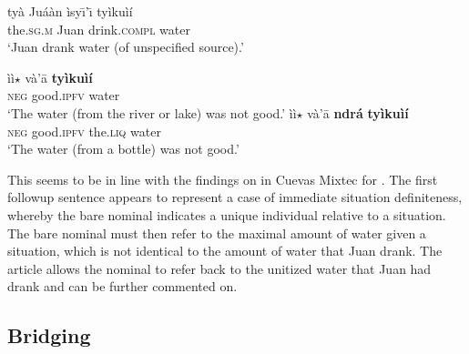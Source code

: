 \documentclass[output=paper,modfonts,nonflat]{langsci/langscibook}
\begin{document}
\ea {}\label{ex:cisneros:69}
\gll
{\ob}ty\`a Ju\'a\`an{\cb} \`isy\=\i'\=\i{} ty\`iku\`i\'i\\
{\db}the.\textsc{sg.m} Juan drink.\textsc{compl} water\\
\glt
`Juan drank water (of unspecified source).'

\ea
\gll
\`i\`i$\star$ v\`a'\=a \textbf{ty\`iku\`i\'i}\\
\textsc{neg} good.\textsc{ipfv} water\\
\glt
`The water (from the river or lake) was not good.'
\ex
\gll
\`i\`i$\star$ v\`a'\=a {\ob}\textbf{ndr\'a} \textbf{ty\`iku\`i\'i}{\cb}\\
\textsc{neg} good.\textsc{ipfv} {\db}the.\textsc{liq} water\\
\glt
`The water (from a bottle) was not good.'
\z 
\z 

This seems to be in line with the findings on  in Cuevas Mixtec for .  The first followup sentence appears to represent a case of immediate situation definiteness, whereby the bare nominal indicates a unique individual relative to a situation.  The bare nominal must then refer to the maximal amount of water given a situation, which is not identical to the amount of water that Juan drank.  The article allows the nominal to refer back to the unitized water that Juan had drank and can be further commented on.

\subsection{Bridging} \label{sec:cisneros:4.3}
\end{document}
